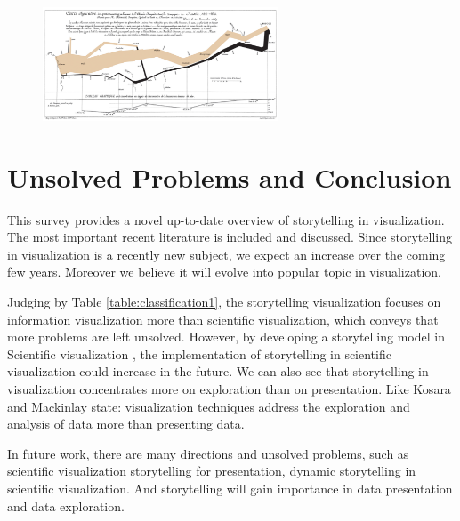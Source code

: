 \documentclass{egpubl}
\begin{document}
\begin{figure}
\begingroup
\centering
\includegraphics[width=7cm]{./images/StorytellingTheNextStepForVisualisation}
\label{fig:StorytellingTheNextStepForVisualisation}
\endgroup
\end{figure}

\section{Unsolved Problems and Conclusion}
This survey provides a novel up-to-date overview of storytelling in visualization. The most important recent literature is included and discussed. Since storytelling in visualization is a recently new subject, we expect an increase over the coming few years. Moreover we believe it will evolve into popular topic in visualization.

Judging by Table \ref{table:classification1}, the storytelling visualization focuses on information visualization more than scientific visualization, which conveys that more problems are left unsolved. However, by developing a storytelling model in Scientific visualization \cite{wohlfart2}, the implementation of storytelling in scientific visualization could increase in the future. We can also see that  storytelling in visualization concentrates more on exploration than on presentation. Like  Kosara and Mackinlay \cite{Kosara} state: visualization techniques address the exploration and analysis of data more than presenting data.

In future work, there are many directions and unsolved problems, such as scientific visualization storytelling for presentation, dynamic storytelling in scientific visualization. And storytelling will gain importance in data presentation and data exploration.
\end{document}
